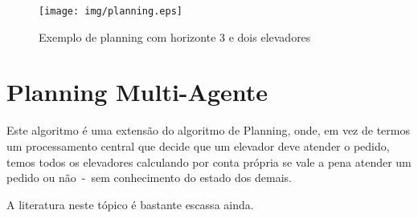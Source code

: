 \begin{figure}[htb!]
  \centering
  \texttt{[image: img/planning.eps]}
  \caption{Exemplo de planning com horizonte 3 e dois elevadores}
\label{fig:planning}
\end{figure}

\section{Planning Multi-Agente}

Este algoritmo é uma extensão do algoritmo de Planning, onde, em vez de termos
um processamento central que decide que um elevador deve atender o pedido, temos
todos os elevadores calculando por conta própria se vale a pena atender um
pedido ou não~-~sem conhecimento do estado dos demais.

A literatura neste tópico é bastante escassa ainda.
